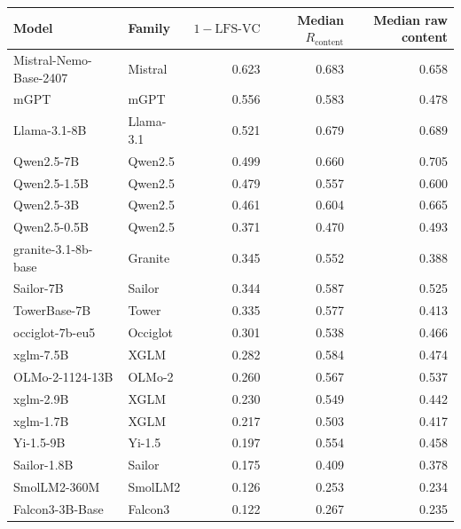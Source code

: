 \begin{center}\small
\begin{tabular}{llrrr}
\toprule
Model & Family & $1-\mathrm{LFS\mbox{-}VC}$ & Median $R_{\mathrm{content}}$ & Median raw content \\
\midrule
Mistral-Nemo-Base-2407 & Mistral & 0.623 & 0.683 & 0.658 \\
mGPT & mGPT & 0.556 & 0.583 & 0.478 \\
Llama-3.1-8B & Llama-3.1 & 0.521 & 0.679 & 0.689 \\
Qwen2.5-7B & Qwen2.5 & 0.499 & 0.660 & 0.705 \\
Qwen2.5-1.5B & Qwen2.5 & 0.479 & 0.557 & 0.600 \\
Qwen2.5-3B & Qwen2.5 & 0.461 & 0.604 & 0.665 \\
Qwen2.5-0.5B & Qwen2.5 & 0.371 & 0.470 & 0.493 \\
granite-3.1-8b-base & Granite & 0.345 & 0.552 & 0.388 \\
Sailor-7B & Sailor & 0.344 & 0.587 & 0.525 \\
TowerBase-7B & Tower & 0.335 & 0.577 & 0.413 \\
occiglot-7b-eu5 & Occiglot & 0.301 & 0.538 & 0.466 \\
xglm-7.5B & XGLM & 0.282 & 0.584 & 0.474 \\
OLMo-2-1124-13B & OLMo-2 & 0.260 & 0.567 & 0.537 \\
xglm-2.9B & XGLM & 0.230 & 0.549 & 0.442 \\
xglm-1.7B & XGLM & 0.217 & 0.503 & 0.417 \\
Yi-1.5-9B & Yi-1.5 & 0.197 & 0.554 & 0.458 \\
Sailor-1.8B & Sailor & 0.175 & 0.409 & 0.378 \\
SmolLM2-360M & SmolLM2 & 0.126 & 0.253 & 0.234 \\
Falcon3-3B-Base & Falcon3 & 0.122 & 0.267 & 0.235 \\
\bottomrule
\end{tabular}
\end{center}
